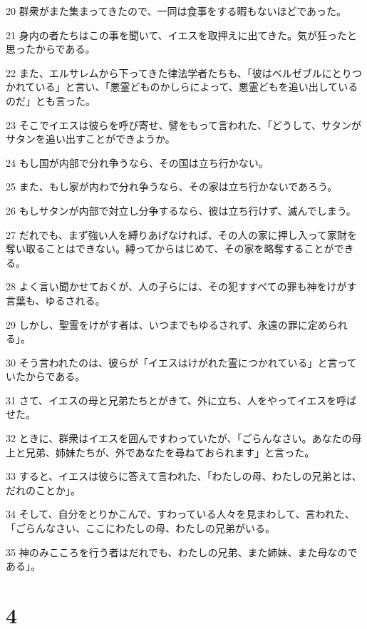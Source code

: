 \par 20 群衆がまた集まってきたので、一同は食事をする暇もないほどであった。
\par 21 身内の者たちはこの事を聞いて、イエスを取押えに出てきた。気が狂ったと思ったからである。
\par 22 また、エルサレムから下ってきた律法学者たちも、「彼はベルゼブルにとりつかれている」と言い、「悪霊どものかしらによって、悪霊どもを追い出しているのだ」とも言った。
\par 23 そこでイエスは彼らを呼び寄せ、譬をもって言われた、「どうして、サタンがサタンを追い出すことができようか。
\par 24 もし国が内部で分れ争うなら、その国は立ち行かない。
\par 25 また、もし家が内わで分れ争うなら、その家は立ち行かないであろう。
\par 26 もしサタンが内部で対立し分争するなら、彼は立ち行けず、滅んでしまう。
\par 27 だれでも、まず強い人を縛りあげなければ、その人の家に押し入って家財を奪い取ることはできない。縛ってからはじめて、その家を略奪することができる。
\par 28 よく言い聞かせておくが、人の子らには、その犯すすべての罪も神をけがす言葉も、ゆるされる。
\par 29 しかし、聖霊をけがす者は、いつまでもゆるされず、永遠の罪に定められる」。
\par 30 そう言われたのは、彼らが「イエスはけがれた霊につかれている」と言っていたからである。
\par 31 さて、イエスの母と兄弟たちとがきて、外に立ち、人をやってイエスを呼ばせた。
\par 32 ときに、群衆はイエスを囲んですわっていたが、「ごらんなさい。あなたの母上と兄弟、姉妹たちが、外であなたを尋ねておられます」と言った。
\par 33 すると、イエスは彼らに答えて言われた、「わたしの母、わたしの兄弟とは、だれのことか」。
\par 34 そして、自分をとりかこんで、すわっている人々を見まわして、言われた、「ごらんなさい、ここにわたしの母、わたしの兄弟がいる。
\par 35 神のみこころを行う者はだれでも、わたしの兄弟、また姉妹、また母なのである」。

\chapter{4}

